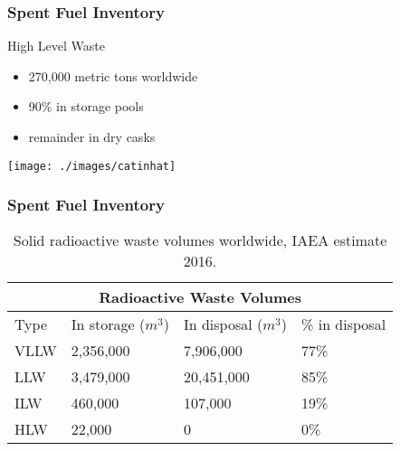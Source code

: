 \begin{frame}[fragile]
        \frametitle{Spent Fuel Inventory}
\begin{block}{High Level Waste}
        \begin{itemize}
                \item 270,000 metric tons worldwide
                \item 90\% in storage pools 
                \item remainder in dry casks
        \end{itemize}
                \texttt{[image: ./images/catinhat]}
        \end{block}
\end{frame}

\begin{frame}[fragile]
        \frametitle{Spent Fuel Inventory}
    \begin{table}
      \centering
      \footnotesize{
      \begin{tabular}{l|lll}
        \multicolumn{4}{c}{\textbf{Radioactive Waste Volumes}}\\
        \hline
Type & In storage ($m^3$) & In disposal ($m^3$)  &  \% in disposal\\
        \hline
VLLW &   2,356,000 &   7,906,000  &  77\%\\
LLW  &  3,479,000  &  20,451,000 &   85\%\\
ILW  &  460,000  &  107,000  &  19\%\\
HLW  &  22,000 &   0   & 0\%\\
        \hline
      \end{tabular}
      \caption[SNF volumes]{Solid radioactive waste volumes worldwide, IAEA 
      estimate 2016. \cite{iaea}}
      \label{tab:vol}
      }
    \end{table}
    \end{frame}



